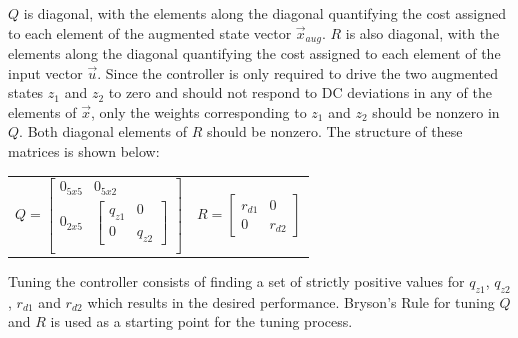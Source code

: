 \documentclass[conference, twocolumn, letterpaper]{IEEEtran}
\begin{document}
$Q$ is diagonal, with the elements along the diagonal quantifying the cost assigned to each element of the augmented state vector $\vec{x}_{aug}$. $R$ is also diagonal, with the elements along the diagonal quantifying the cost assigned to each element of the input vector $\vec{u}$. Since the controller is only required to drive the two augmented states $z_1$ and $z_2$ to zero and should not respond to DC deviations in any of the elements of $\vec{x}$, only the weights corresponding to $z_1$ and $z_2$ should be nonzero in $Q$. Both diagonal elements of $R$ should be nonzero. The structure of these matrices is shown below:

\vspace{-0.6cm}
\renewcommand{\arraystretch}{1.25}
\begin{table}[ht]
\centering
\begin{tabular}{p{4.7cm}p{3cm}}
\begin{equation*}
Q = 
	\begin{bmatrix}
		0_{5x5} & 0_{5x2} \\
		0_{2x5} & \begin{bmatrix} q_{z1} & 0 \\ 0 & q_{z2} \end{bmatrix} \\
	\end{bmatrix}
\end{equation*}
&
\vspace{-0.1cm}
\begin{equation*}
R = 
	\begin{bmatrix}
		r_{d1} & 0 \\
		0 & r_{d2}
	\end{bmatrix}
\end{equation*}
\end{tabular}
\end{table}

\vspace{-0.5cm}

Tuning the controller consists of finding a set of strictly positive values for $q_{z1}$, $q_{z2}$, $r_{d1}$ and $r_{d2}$ which results in the desired performance. Bryson's Rule for tuning $Q$ and $R$ is used as a starting point for the tuning process.
\end{document}
